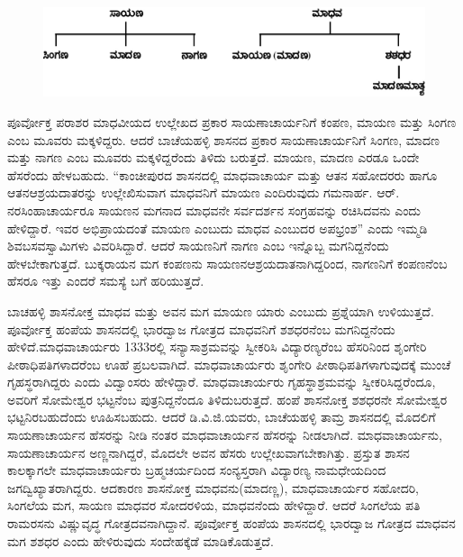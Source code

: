 \begin{figure}[H]
\includegraphics[scale=1.05]{images/chap4/add-chap4fig5.jpeg}
\end{figure}

ಪೂರ್ವೋಕ್ತ ಪರಾಶರ ಮಾಧವೀಯದ ಉಲ್ಲೇಖದ ಪ್ರಕಾರ ಸಾಯಣಾಚಾರ್ಯನಿಗೆ ಕಂಪಣ, ಮಾಯಣ ಮತ್ತು ಸಿಂಗಣ ಎಂಬ ಮೂವರು ಮಕ್ಕಳಿದ್ದರು. ಆದರೆ ಬಾಚೆಯಹಳ್ಳಿ ಶಾಸನದ ಪ್ರಕಾರ ಸಾಯಣಾಚಾರ್ಯನಿಗೆ ಸಿಂಗಣ, ಮಾದಣ ಮತ್ತು ನಾಗಣ ಎಂಬ ಮೂವರು ಮಕ್ಕಳಿದ್ದರೆಂದು ತಿಳಿದು ಬರುತ್ತದೆ. ಮಾಯಣ, ಮಾದಣ ಎರಡೂ ಒಂದೇ ಹೆಸರೆಂದು ಹೇಳಬಹುದು. “ಕಾಂಚೀಪುರದ ಶಾಸನದಲ್ಲಿ ಮಾಧವಾಚಾರ್ಯ ಮತ್ತು ಆತನ ಸಹೋದರರು ಹಾಗೂ ಆತನ\break ಆಶ್ರಯದಾತರನ್ನು ಉಲ್ಲೇಖಿಸುವಾಗ ಮಾಧವನಿಗೆ ಮಾಯಣ ಎಂದಿರುವುದು ಗಮನಾರ್ಹ. ಆರ್​. ನರಸಿಂಹಾಚಾರ್ಯರೂ ಸಾಯಣನ ಮಗನಾದ ಮಾಧವನೇ ಸರ್ವದರ್ಶನ ಸಂಗ್ರಹವನ್ನು ರಚಿಸಿದವನು ಎಂದು ಹೇಳಿದ್ದಾರೆ. ಇವರ ಅಭಿಪ್ರಾಯ\-ದಂತೆ ಮಾಯಣ ಎಂಬುದು ಮಾಧವ ಎಂಬುದರ ಅಪಭ್ರಂಶ” ಎಂದು ಇಮ್ಮಡಿ ಶಿವಬಸವಸ್ವಾಮಿಗಳು ವಿವರಿಸಿದ್ದಾರೆ. ಆದರೆ ಸಾಯಣನಿಗೆ ನಾಗಣ ಎಂಬ ಇನ್ನೊಬ್ಬ ಮಗನಿದ್ದನೆಂದು ಹೇಳಬೇಕಾಗುತ್ತದೆ. ಬುಕ್ಕರಾಯನ ಮಗ ಕಂಪಣನು ಸಾಯಣನ\break ಆಶ್ರಯದಾತನಾಗಿದ್ದರಿಂದ, ನಾಗಣನಿಗೆ ಕಂಪಣನೆಂಬ ಹೆಸರೂ ಇತ್ತು ಎಂದರೆ ಸಮಸ್ಯೆ ಬಗೆ ಹರಿಯುತ್ತದೆ.

ಬಾಚಹಳ್ಳಿ ಶಾಸನೋಕ್ತ ಮಾಧವ ಮತ್ತು ಅವನ ಮಗ ಮಾಯಣ ಯಾರು ಎಂಬುದು ಪ್ರಶ್ನೆಯಾಗಿ ಉಳಿಯುತ್ತದೆ. ಪೂರ್ವೋಕ್ತ ಹಂಪೆಯ ಶಾಸನದಲ್ಲಿ ಭಾರದ್ವಾಜ ಗೋತ್ರದ ಮಾಧವನಿಗೆ ಶಶಧರನೆಂಬ ಮಗನಿದ್ದನೆಂದು ಹೇಳಿದೆ.\break ಮಾಧವಾಚಾರ್ಯರು 1333ರಲ್ಲಿ ಸನ್ಯಾಸಾಶ್ರಮವನ್ನು ಸ್ವೀಕರಿಸಿ ವಿದ್ಯಾರಣ್ಯರೆಂಬ ಹೆಸರಿನಿಂದ ಶೃಂಗೇರಿ ಪೀಠಾಧಿಪತಿ\-ಗಳಾದರೆಂಬ ಊಹೆ ಪ್ರಬಲವಾಗಿದೆ. ಮಾಧವಾಚಾರ್ಯರು ಶೃಂಗೇರಿ ಪೀಠಾಧಿಪತಿಗಳಾಗುವುದಕ್ಕೆ ಮುಂಚೆ ಗೃಹಸ್ಥರಾಗಿದ್ದರು ಎಂದು ವಿದ್ವಾಂಸರು ಹೇಳಿದ್ದಾರೆ. ಮಾಧವಾಚಾರ್ಯರು ಗೃಹಸ್ಥಾಶ್ರಮವನ್ನು ಸ್ವೀಕರಿಸಿದ್ದರೆಂದೂ, ಅವರಿಗೆ ಸೋಮೇಶ್ವರ ಭಟ್ಟನೆಂಬ ಪುತ್ರನಿದ್ದನೆಂದೂ ತಿಳಿದುಬರುತ್ತದೆ. ಹಂಪೆ ಶಾಸನೋಕ್ತ ಶಶಧರನೇ ಸೋಮೇಶ್ವರ ಭಟ್ಟನಿರಬಹುದೆಂದು ಊಹಿಸಬಹುದು. ಆದರೆ ಡಿ.ವಿ.ಜಿ.ಯವರು, ಬಾಚೆಯಹಳ್ಳಿ ತಾಮ್ರ ಶಾಸನದಲ್ಲಿ ಮೊದಲಿಗೆ ಸಾಯಣಾಚಾರ್ಯನ ಹೆಸರನ್ನು ನೀಡಿ ನಂತರ ಮಾಧವಾಚಾರ್ಯನ ಹೆಸರನ್ನು ನೀಡಲಾಗಿದೆ. ಮಾಧವಾಚಾರ್ಯನು, ಸಾಯಣಾಚಾರ್ಯನ ಅಣ್ಣ\-ನಾಗಿದ್ದರೆ, ಮೊದಲೇ ಅವನ ಹೆಸರು ಉಲ್ಲೇಖವಾಗಬೇಕಾಗಿತ್ತು. ಪ್ರಸ್ತುತ ಶಾಸನ ಕಾಲಕ್ಕಾಗಲೇ ಮಾಧವಾಚಾರ್ಯರು ಬ್ರಹ್ಮಚರ್ಯದಿಂದ ಸಂನ್ಯಸ್ತರಾಗಿ ವಿದ್ಯಾರಣ್ಯ ನಾಮಧೇಯದಿಂದ ಜಗದ್ವಿಖ್ಯಾತರಾಗಿದ್ದರು. ಆದಕಾರಣ ಶಾಸನೋಕ್ತ ಮಾಧವನು(ಮಾದಣ್ಣ), ಮಾಧವಾಚಾರ್ಯರ ಸಹೋದರಿ, ಸಿಂಗಲೆಯ ಮಗ, ಸಾಯಣ ಮಾಧವರ ಸೋದರಳಿಯ, ಮಾಧವನೆಂದು ಹೇಳಿದ್ದಾರೆ. ಆದರೆ ಸಿಂಗಲೆಯ ಪತಿ ರಾಮರಸನು ವಿಷ್ಣುವೃದ್ಧ ಗೋತ್ರದವನಾಗಿದ್ದಾನೆ. ಪೂರ್ವೋಕ್ತ ಹಂಪೆಯ ಶಾಸನದಲ್ಲಿ ಭಾರದ್ವಾಜ ಗೋತ್ರದ ಮಾಧವನ ಮಗ ಶಶಧರ ಎಂದು ಹೇಳಿರುವುದು ಸಂದೇಹಕ್ಕೆಡೆ ಮಾಡಿಕೊಡುತ್ತದೆ.

